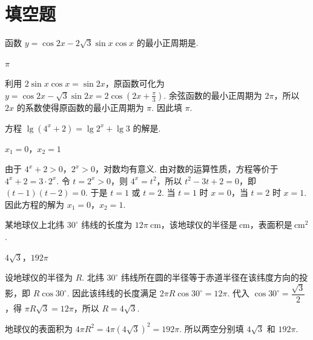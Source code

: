 \section{填空题}
\begin{problem}
函数 \(y=\cos 2x-2\sqrt{3}\sin x\cos x\) 的最小正周期是\fillinblank{}.
\end{problem}

\begin{answer}
\(\pi\)
\end{answer}

\begin{solution}
利用 \(2\sin x\cos x=\sin 2x\)，原函数可化为
\(y=\cos 2x-\sqrt3\sin 2x=2\cos\left(2x+\frac{\pi}{3}\right)\).
余弦函数的最小正周期为 \(2\pi\)，所以 \(2x\) 的系数使得原函数的最小正周期为 \(\pi\). 因此填 \(\pi\).
\end{solution}

\begin{problem}
方程 \(\lg(4^x+2)=\lg 2^x+\lg 3\) 的解是\fillinblank{}.
\end{problem}

\begin{answer}
\(x_1=0\)，\(x_2=1\)
\end{answer}

\begin{solution}
由于 \(4^x+2>0\)，\(2^x>0\)，对数均有意义. 由对数的运算性质，方程等价于
\(4^x+2=3\cdot2^x\). 令 \(t=2^x>0\)，则 \(4^x=t^2\)，所以 \(t^2-3t+2=0\)，即 \((t-1)(t-2)=0\).
于是 \(t=1\) 或 \(t=2\). 当 \(t=1\) 时 \(x=0\)，当 \(t=2\) 时 \(x=1\). 因此方程的解为 \(x_1=0\)，\(x_2=1\).
\end{solution}

\begin{problem}
某地球仪上北纬 \(30^{\circ}\) 纬线的长度为 \(12\pi\mathrm{~cm}\)，该地球仪的半径是\fillinblank{}\(\mathrm{~cm}\)，表面积是\fillinblank{}\(\mathrm{~cm}^2\).
\end{problem}

\begin{answer}
\(4\sqrt{3}\)，\(192\pi\)
\end{answer}

\begin{solution}
设地球仪的半径为 \(R\). 北纬 \(30^{\circ}\) 纬线所在圆的半径等于赤道半径在该纬度方向的投影，即 \(R\cos30^{\circ}\). 因此该纬线的长度满足
\(2\pi R\cos30^{\circ}=12\pi\).
代入 \(\cos30^{\circ}=\dfrac{\sqrt3}{2}\)，得 \(\pi R\sqrt3=12\pi\)，所以 \(R=4\sqrt3\).

地球仪的表面积为 \(4\pi R^2=4\pi(4\sqrt3)^2=192\pi\).
所以两空分别填 \(4\sqrt3\) 和 \(192\pi\).
\end{solution}

